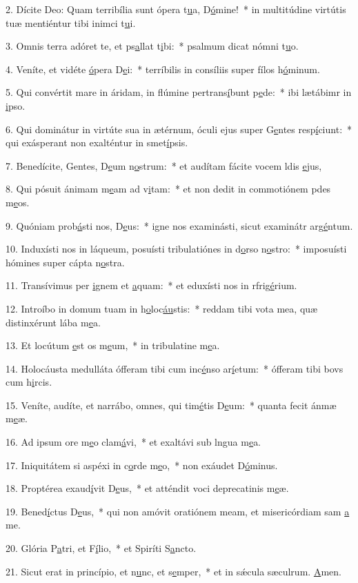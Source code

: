 2. Dícite Deo: Quam terribília sunt ópera t\uline{u}a, D\uline{ó}mine!~* in multitúdine virtútis tuæ mentiéntur tibi inimci t\uline{u}i.\par 
3. Omnis terra adóret te, et ps\uline{a}llat t\uline{i}bi:~* psalmum dicat nómni t\uline{u}o.\par 
4. Veníte, et vidéte \uline{ó}pera D\uline{e}i:~* terríbilis in consíliis super fílos h\uline{ó}minum.\par 
5. Qui convértit mare in áridam, in flúmine pertrans\uline{í}bunt p\uline{e}de:~* ibi lætábimr in \uline{i}pso.\par 
6. Qui dominátur in virtúte sua in ætérnum, óculi ejus super G\uline{e}ntes resp\uline{í}ciunt:~* qui exásperant non exalténtur in smet\uline{í}psis.\par 
7. Benedícite, Gentes, D\uline{e}um n\uline{o}strum:~* et audítam fácite vocem ldis \uline{e}jus,\par 
8. Qui pósuit ánimam m\uline{e}am ad v\uline{i}tam:~* et non dedit in commotiónem pdes m\uline{e}os.\par 
9. Quóniam prob\uline{á}sti nos, D\uline{e}us:~* igne nos examinásti, sicut examinátr arg\uline{é}ntum.\par 
10. Induxísti nos in láqueum, posuísti tribulatiónes in d\uline{o}rso n\uline{o}stro:~* imposuísti hómines super cápta n\uline{o}stra.\par 
11. Transívimus per \uline{i}gnem et \uline{a}quam:~* et eduxísti nos in rfrig\uline{é}rium.\par 
12. Introíbo in domum tuam in h\uline{o}loc\uline{áu}stis:~* reddam tibi vota mea, quæ distinxérunt lába m\uline{e}a.\par 
13. Et locútum \uline{e}st os m\uline{e}um,~* in tribulatine m\uline{e}a.\par 
14. Holocáusta medulláta ófferam tibi cum inc\uline{é}nso ar\uline{í}etum:~* ófferam tibi bovs cum h\uline{i}rcis.\par 
15. Veníte, audíte, et narrábo, omnes, qui tim\uline{é}tis D\uline{e}um:~* quanta fecit ánmæ m\uline{e}æ.\par 
16. Ad ipsum ore m\uline{e}o clam\uline{á}vi,~* et exaltávi sub lngua m\uline{e}a.\par 
17. Iniquitátem si aspéxi in c\uline{o}rde m\uline{e}o,~* non exáudet D\uline{ó}minus.\par 
18. Proptérea exaud\uline{í}vit D\uline{e}us,~* et atténdit voci deprecatinis m\uline{e}æ.\par 
19. Bened\uline{í}ctus D\uline{e}us,~* qui non amóvit oratiónem meam, et misericórdiam sam \uline{a} me.\par 
20. Glória P\uline{a}tri, et F\uline{í}lio,~* et Spiríti S\uline{a}ncto.\par 
21. Sicut erat in princípio, et n\uline{u}nc, et s\uline{e}mper,~* et in sǽcula sæculrum. \uline{A}men.\par 
